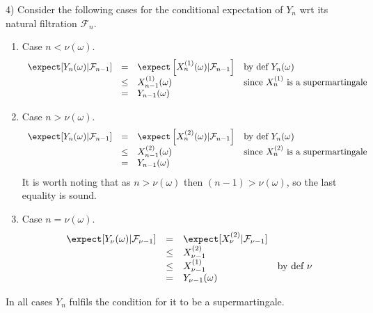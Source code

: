 \documentclass[11pt,a4paper]{article}
\begin{document}
\begin{answer}{4)}
  Consider the following cases for the conditional expectation of $Y_n$ wrt its natural filtration $\mathcal{F}_n$.
  \begin{enumerate}
    \item Case $n<\nu(\omega)$.
    \[\begin{array}{rcll}
      \expect[Y_n(\omega)|\mathcal{F}_{n-1}]&=&\expect\left[X_n^{(1)}(\omega)|\mathcal{F}_{n-1}\right]&\text{by def }Y_n(\omega)\\
      &\leq&X_{n-1}^{(1)}(\omega)&\text{since }X_n^{(1)}\text{ is a supermartingale}\\
      &=&Y_{n-1}(\omega)
    \end{array}\]
    \item Case $n>\nu(\omega)$.
    \[\begin{array}{rcll}
      \expect[Y_n(\omega)|\mathcal{F}_{n-1}]&=&\expect\left[X_n^{(2)}(\omega)|\mathcal{F}_{n-1}\right]&\text{by def }Y_n(\omega)\\
      &\leq&X_{n-1}^{(2)}(\omega)&\text{since }X_n^{(2)}\text{ is a supermartingale}\\
      &=&Y_{n-1}(\omega)
    \end{array}\]
    It is worth noting that as $n>\nu(\omega)$ then $(n-1)>\nu(\omega)$, so the last equality is sound.
    \item Case $n=\nu(\omega)$.
    \[\begin{array}{rcll}
      \expect[Y_\nu(\omega)|\mathcal{F}_{\nu-1}]&=&\expect[X_\nu^{(2)}|\mathcal{F}_{\nu-1}]\\
      &\leq&X_{\nu-1}^{(2)}\\
      &\leq&X_{\nu-1}^{(1)}&\text{by def }\nu\\
      &=&Y_{\nu-1}(\omega)
    \end{array}\]
  \end{enumerate}
  In all cases $Y_n$ fulfils the condition for it to be a supermartingale.
\end{answer}
\end{document}
